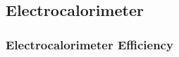 \subsection{\label{sec:calib.ec}Electrocalorimeter}

\subsubsection{\label{sec:calib.ec.eff}Electrocalorimeter Efficiency}

\FloatBarrier
